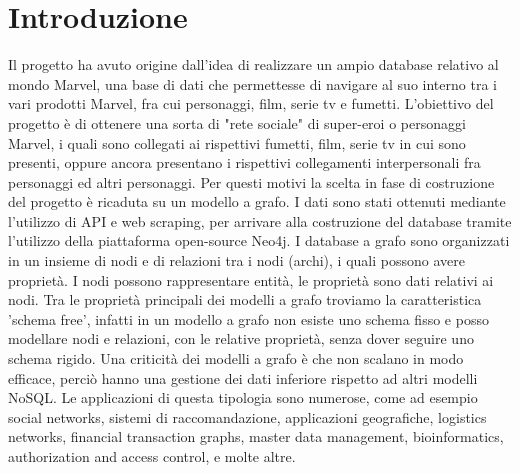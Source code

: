 \documentclass[
12pt, %
a4paper, %
oneside, %
headinclude,footinclude, %
BCOR5mm, %
]{scrartcl}
\begin{document}



\newpage %


\section{Introduzione}
Il progetto ha avuto origine dall'idea di realizzare un ampio database relativo al mondo Marvel, una base di dati che permettesse di navigare al suo interno tra i vari prodotti Marvel, fra cui personaggi, film, serie tv e fumetti.
L'obiettivo del progetto è di ottenere una sorta di "rete sociale" di super-eroi o personaggi Marvel, i quali sono collegati ai rispettivi fumetti, film, serie tv in cui sono presenti, oppure ancora presentano i rispettivi collegamenti interpersonali fra personaggi ed altri personaggi.
Per questi motivi la scelta in fase di costruzione del progetto è ricaduta su un modello a grafo.
I dati sono stati ottenuti mediante l'utilizzo di API e web scraping, per arrivare alla costruzione del database tramite l'utilizzo della piattaforma open-source Neo4j.
I database a grafo sono organizzati in un insieme di nodi e di relazioni tra i nodi (archi), i quali possono avere proprietà. I nodi possono rappresentare entità, le proprietà sono dati relativi ai nodi.
Tra le proprietà principali dei modelli a grafo troviamo la caratteristica 'schema free', infatti in un modello a grafo non esiste uno schema fisso e posso modellare nodi e relazioni, con le relative proprietà, senza dover seguire uno schema rigido.
Una criticità dei modelli a grafo è che non scalano in modo efficace, perciò hanno una gestione dei dati inferiore rispetto ad altri modelli NoSQL.
Le applicazioni di questa tipologia sono numerose, come ad esempio social networks, sistemi di raccomandazione,
applicazioni geografiche, logistics networks, financial transaction graphs, master data management, bioinformatics,
authorization and access control, e molte altre.
 
\end{document}
